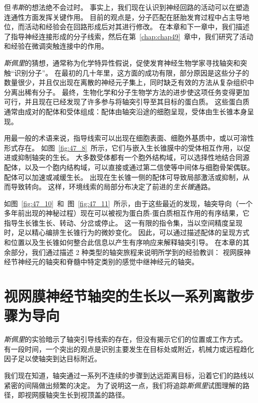 但\textit{韦斯}的想法绝不会过时。
事实上，我们现在认识到神经回路的活动可以在塑造连通性方面发挥关键作用。
目前的观点是，分子匹配在胚胎发育过程中占主导地位，而活动和经验会在回路形成后对其进行修改。
在本章和下一章中，我们描述了指导神经连接形成的分子线索，然后在第~\ref{chap:chap49}~章中，我们研究了活动和经验在微调突触连接中的作用。


\textit{斯佩里}的猜想，通常称为化学特异性假说，促使发育神经生物学家寻找轴突和突触“识别分子”。
在最初的几十年里，这方面的成功有限，部分原因是这些分子的数量很少，并且仅出现在离散的神经元子集上，同时缺乏有效的方法从复杂组织中分离出稀有分子。
最终，生物化学和分子生物学方法的进步使这项任务变得更加可行，并且现在已经发现了许多参与将轴突引导至其目标的蛋白质。
这些蛋白质通常由成对的配体和受体组成：配体由轴突沿途的细胞呈现，受体由生长锥本身呈现。


用最一般的术语来说，指导线索可以出现在细胞表面、细胞外基质中，或以可溶性形式存在。
如图~\ref{fig:47_8}~所示，它们与嵌入生长锥膜中的受体相互作用，以促进或抑制轴突的生长。
大多数受体都有一个胞外结构域，可以选择性地结合同源配体，以及一个胞内结构域，可以直接或通过第二信使等中间体与细胞骨架偶联。
配体可以加速或减缓生长。
出现在生长锥一侧的配体可导致局部激活或抑制，从而导致转向。
这样，环境线索的局部分布决定了前进的\textit{生长锥}通路。


如图~\ref{fig:47_10}~和~图~\ref{fig:47_11}~所示，由于这些最近的发现，轴突导向（一个多年前出现的神秘过程）现在可以被视为蛋白质-蛋白质相互作用的有序结果，它指导生长锥生长、转动、分岔或停止。
这一有限的指令集，当以空间精度呈现时，足以精心编排生长锥行为的微妙变化。
因此，可以通过描述配体的呈现方式和位置以及生长锥如何整合此信息以产生有序响应来解释轴突引导。
在本章的其余部分，我们通过描述 2 种类型的轴突旅程来说明所学到的经验教训：
视网膜神经节神经元的轴突和脊髓中特定类别的感觉中继神经元的轴突。



\section{视网膜神经节轴突的生长以一系列离散步骤为导向}

\textit{斯佩里}的实验暗示了轴突引导线索的存在，但没有揭示它们的位置或工作方式。
有一段时间，一个突出的观点是识别主要发生在目标处或附近，机械力或远程趋化因子足以使轴突到达目标附近。


我们现在知道，轴突通过一系列不连续的步骤到达远距离目标，沿着它们的路线以紧密的间隔做出频繁的决定。
为了说明这一点，我们将追踪\textit{斯佩里}试图理解的路径，即视网膜轴突生长到视顶盖的路径。



